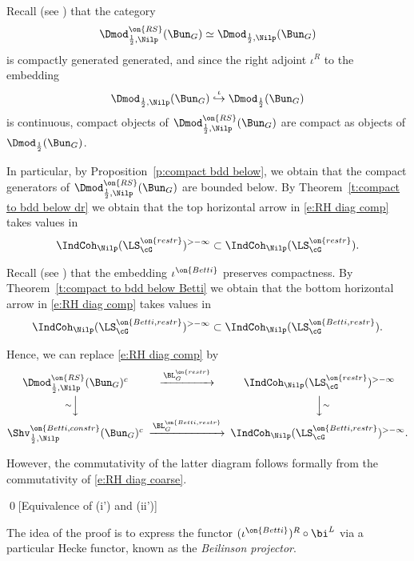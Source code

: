 \documentclass[9pt]{amsart}
\theoremstyle{remark}
\theoremstyle{definition}
\theoremstyle{remark}
\newcommand{\thmref}[1]{Theorem~\ref{#1}}
\newcommand{\propref}[1]{Proposition~\ref{#1}}
\numberwithin{equation}{section}
\begin{document}
\sssec{}

Recall (see \cite[Theorem 16.1.1]{AGKRRV}) that the category 
$$\Dmod^{\on{RS}}_{\frac{1}{2},\Nilp}(\Bun_G) \simeq \Dmod_{\frac{1}{2},\Nilp}(\Bun_G)$$ 
is compactly generated generated, and since the right adjoint $\iota^R$ to the embedding 
$$\Dmod_{\frac{1}{2},\Nilp}(\Bun_G)\overset{\iota}\hookrightarrow \Dmod_{\frac{1}{2}}(\Bun_G)$$
is continuous, compact objects of $\Dmod^{\on{RS}}_{\frac{1}{2},\Nilp}(\Bun_G)$ are compact as 
objects of $\Dmod_{\frac{1}{2}}(\Bun_G)$.

\medskip

In particular, by
\propref{p:compact bdd below}, we obtain that the compact generators of  
$\Dmod^{\on{RS}}_{\frac{1}{2},\Nilp}(\Bun_G)$ are bounded below.  By \thmref{t:compact to bdd below dr}
we obtain that the top horizontal arrow in \eqref{e:RH diag comp} takes values in 
$$\IndCoh_\Nilp(\LS^{\on{restr}}_\cG)^{>-\infty} \subset \IndCoh_\Nilp(\LS^{\on{restr}}_\cG).$$

\medskip

Recall (see \cite[Sect. 18.3.2]{AGKRRV}) that the embedding $\iota^{\on{Betti}}$ preserves compactness.
By \thmref{t:compact to bdd below Betti} we obtain that the bottom horizontal arrow in \eqref{e:RH diag comp} takes values in 
$$\IndCoh_\Nilp(\LS^{\on{Betti,restr}}_\cG)^{>-\infty}\subset \IndCoh_\Nilp(\LS^{\on{Betti,restr}}_\cG).$$

\medskip

Hence, we can replace \eqref{e:RH diag comp} by 
$$
\CD
\Dmod^{\on{RS}}_{\frac{1}{2},\Nilp}(\Bun_G)^c  @>{\BL_G^{\on{restr}}}>>  \IndCoh_\Nilp(\LS^{\on{restr}}_\cG)^{>-\infty}  \\
@V{\sim}VV @VV{\sim}V \\
\Shv^{\on{Betti,constr}}_{\frac{1}{2},\Nilp}(\Bun_G)^c @>{\BL_G^{\on{Betti,restr}}}>> \IndCoh_\Nilp(\LS^{\on{Betti,restr}}_\cG)^{>-\infty}. 
\endCD
$$

\medskip

However, the commutativity of the latter diagram follows formally from the commutativity of \eqref{e:RH diag coarse}.

\qed[Equivalence of (i') and (ii')]

\ssec{Proof of \propref{p:delta funs}}

The idea of the proof is to express the functor $(\iota^{\on{Betti}})^R\circ \bi^L$ via a particular Hecke functor, 
known as the \emph{Beilinson projector}. 

\medskip
\end{document}
